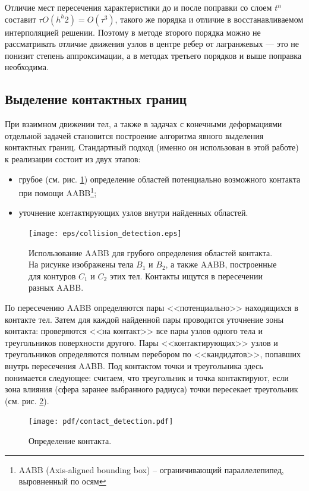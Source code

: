 Отличие мест пересечения характеристики до и после поправки со слоем $t^n$ составит $\tau O(h^h2) = O(\tau^3)$, такого же порядка и отличие в восстанавливаемом интерполяцией решении. Поэтому в методе второго порядка можно не рассматривать отличие движения узлов в центре ребер от лагранжевых — это не понизит степень аппроксимации, а в методах третьего порядков и выше поправка необходима.

\clearpage
\newpage

\subsection{Выделение контактных границ}

При взаимном движении тел, а также в задачах с конечными деформациями отдельной задачей становится построение алгоритма явного выделения контактных границ. Стандартный подход (именно он использован в этой работе) к реализации состоит из двух этапов:
\begin{itemize}
	\item грубое (см. рис. \ref{pic:collision_detection}) определение областей потенциально возможного контакта при помощи AABB\footnote{AABB (Axis-aligned bounding box) -- ограничивающий параллелепипед, выровненный по осям };
	\item уточнение контактирующих узлов внутри найденных областей.
\end{itemize}
\begin{figure}[htp]
\centering
\texttt{[image: eps/collision\_detection.eps]}
\caption{Использование AABB для грубого определения областей контакта. На
рисунке изображены тела $B_1$ и $B_2$, а также AABB, построенные для контуров
$C_1$ и $C_2$ этих тел. Контакты ищутся в пересечении разных AABB.}
\label{pic:collision_detection}
\end{figure}
По пересечению AABB определяются пары <<потенциально>> находящихся в контакте тел. Затем для каждой найденной пары проводится уточнение зоны контакта: проверяются <<на контакт>> все пары узлов одного тела и треугольников поверхности другого. Пары <<контактирующих>> узлов и треугольников определяются полным перебором по <<кандидатов>>, попавших внутрь пересечения AABB. Под контактом точки и треугольника здесь понимается следующее: считаем, что треугольник и точка контактируют, если зона влияния (сфера заранее выбранного радиуса) точки пересекает треугольник (см. рис. \ref{pic:contact_detection}).
\begin{figure}[htp]
\centering
\texttt{[image: pdf/contact\_detection.pdf]}
\caption{Определение контакта.}
\label{pic:contact_detection}
\end{figure}
